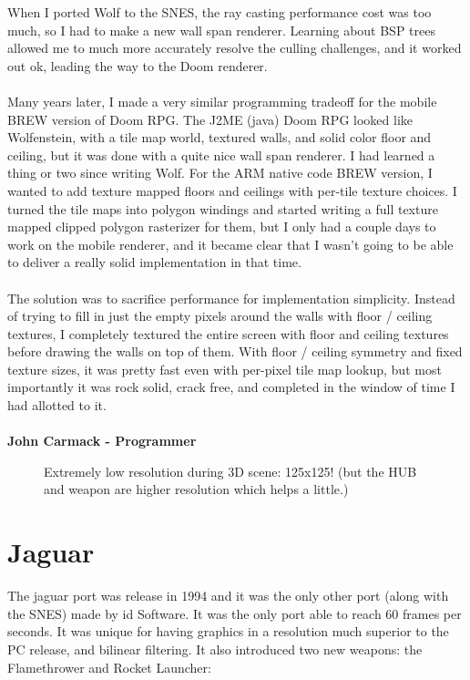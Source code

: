\documentclass[book.tex]{subfiles}
\begin{document}
\begin{fancyquotes}
    When I ported Wolf to the SNES, the ray casting performance cost was too much, so I had to make a new wall span renderer.  Learning about BSP trees allowed me  to much more accurately resolve the culling challenges, and it worked out ok, leading the way to the Doom renderer.\\
\\
Many years later, I made a very similar programming tradeoff for the mobile BREW version of Doom RPG.  The J2ME (java) Doom RPG looked like Wolfenstein, with a tile map world, textured walls, and solid color floor and ceiling, but it was done with a quite nice wall span renderer.  I had learned a thing or two since writing Wolf.  For the ARM native code BREW version, I wanted to add texture mapped floors and ceilings with per-tile texture choices.  I turned the tile maps into polygon windings and started writing a full texture mapped clipped polygon rasterizer for them, but I only had a couple days to work on the mobile renderer, and it became clear that I wasn’t going to be able to deliver a really solid implementation in that time.\\
 \\
The solution was to sacrifice performance for implementation simplicity.  Instead of trying to fill in just the empty pixels around the walls with floor / ceiling textures, I completely textured the entire screen with floor and ceiling textures before drawing the walls on top of them.  With floor / ceiling symmetry and fixed texture sizes, it was pretty fast even with per-pixel tile map lookup, but most importantly it was rock solid, crack free, and completed in the window of time I had allotted to it.\\
\\
\textbf{John Carmack - Programmer}
\end{fancyquotes}


\par
\begin{figure}[H]
\centering
 \caption{Extremely low resolution during 3D scene: 125x125! (but the HUB and weapon are higher resolution which helps a little.)}
 \end{figure}
 \par










\section{Jaguar}
The jaguar port was release in 1994 and it was the only other port (along with the SNES) made by id Software. It was the only port able to reach 60 frames per seconds. It was unique for having graphics in a resolution much superior to the PC release, and bilinear filtering. It also introduced two new weapons: the Flamethrower and Rocket Launcher:\\
\par
\end{document}
